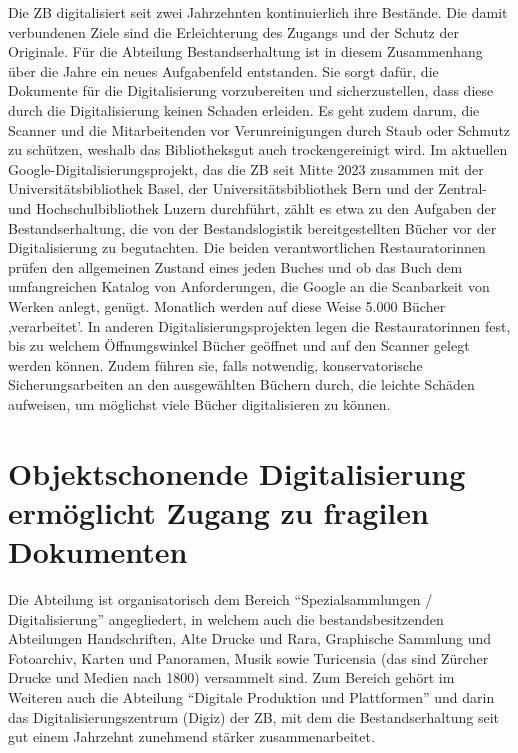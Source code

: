 \documentclass[a4paper,
fontsize=11pt,
oneside,
numbers=noperiodatend,
parskip=half-,
bibliography=totoc,
final
]{scrartcl}
\begin{document}
Die ZB digitalisiert seit zwei Jahrzehnten kontinuierlich ihre Bestände.
Die damit verbundenen Ziele sind die Erleichterung des Zugangs und der
Schutz der Originale. Für die Abteilung Bestandserhaltung ist in diesem
Zusammenhang über die Jahre ein neues Aufgabenfeld entstanden. Sie sorgt
dafür, die Dokumente für die Digitalisierung vorzubereiten und
sicherzustellen, dass diese durch die Digitalisierung keinen Schaden
erleiden. Es geht zudem darum, die Scanner und die Mitarbeitenden vor
Verunreinigungen durch Staub oder Schmutz zu schützen, weshalb das
Bibliotheksgut auch trockengereinigt wird. Im aktuellen
Google-Digitalisierungsprojekt, das die ZB seit Mitte 2023 zusammen mit
der Universitätsbibliothek Basel, der Universitätsbibliothek Bern und
der Zentral- und Hochschulbibliothek Luzern durchführt, zählt es etwa zu
den Aufgaben der Bestandserhaltung, die von der Bestandslogistik
bereitgestellten Bücher vor der Digitalisierung zu begutachten. Die
beiden verantwortlichen Restauratorinnen prüfen den allgemeinen Zustand
eines jeden Buches und ob das Buch dem umfangreichen Katalog von
Anforderungen, die Google an die Scanbarkeit von Werken anlegt, genügt.
Monatlich werden auf diese Weise 5.000 Bücher ‚verarbeitet'. In anderen
Digitalisierungsprojekten legen die Restauratorinnen fest, bis zu
welchem Öffnungswinkel Bücher geöffnet und auf den Scanner gelegt werden
können. Zudem führen sie, falls notwendig, konservatorische
Sicherungsarbeiten an den ausgewählten Büchern durch, die leichte
Schäden aufweisen, um möglichst viele Bücher digitalisieren zu können.

\pagebreak
\section{Objektschonende Digitalisierung ermöglicht Zugang zu
fragilen
Dokumenten}\label{objektschonende-digitalisierung-ermuxf6glicht-zugang-zu-fragilen-dokumenten}

Die Abteilung ist organisatorisch dem Bereich \enquote{Spezialsammlungen
/ Digitalisierung} angegliedert, in welchem auch die bestandsbesitzenden
Abteilungen Handschriften, Alte Drucke und Rara, Graphische Sammlung und
Fotoarchiv, Karten und Panoramen, Musik sowie Turicensia (das sind
Zürcher Drucke und Medien nach 1800) versammelt sind. Zum Bereich gehört
im Weiteren auch die Abteilung \enquote{Digitale Produktion und
Plattformen} und darin das Digitalisierungszentrum (Digiz) der ZB, mit
dem die Bestandserhaltung seit gut einem Jahrzehnt zunehmend stärker
zusammenarbeitet.
\end{document}
